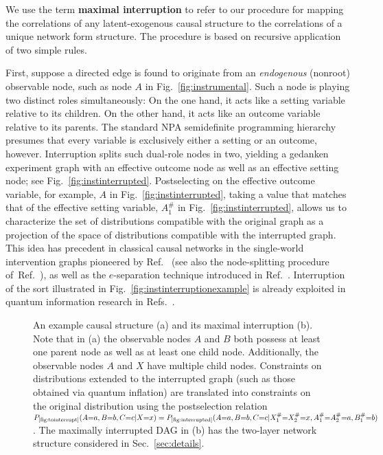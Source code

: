 \documentclass[superscriptaddress,aps,prx,nofootinbib,twocolumn,twoside,reprint,letterpaper,longbibliography]{revtex4-2}
\newcommand{\term}[1]{\textcolor{medblue}{\textbf{#1}}}
\begin{document}
We use the term \term{maximal interruption} to refer to our procedure for mapping the correlations of any latent-exogenous causal structure to the correlations of a unique network form structure. The procedure is based on recursive application of two simple rules.

First, suppose a directed edge is found to originate from an \emph{endogenous} (nonroot) observable node, such as node $A$ in Fig.~\ref{fig:instrumental}. Such a node is playing two distinct roles simultaneously: On the one hand, it acts like a setting variable relative to its children. On the other hand, it acts like an outcome variable relative to its parents. The standard NPA semidefinite programming hierarchy~\cite{npa,npa2} presumes that every variable is exclusively either a setting or an outcome, however. Interruption splits such dual-role nodes in two, yielding a gedanken experiment graph with an effective outcome node as well as an effective setting node; see Fig.~\ref{fig:instinterrupted}. Postselecting on the effective outcome variable, for example, $A$ in Fig.~\ref{fig:instinterrupted}, taking a value that matches that of the effective setting variable, $A^{\#}_1$ in Fig.~\ref{fig:instinterrupted}, allows us to characterize the set of distributions compatible with the original graph as a projection of the space of distributions compatible with the interrupted graph. This idea has precedent in classical causal networks in the single-world intervention graphs pioneered by Ref.~\cite{Richardson2013SingleWI} (see also the node-splitting procedure of~Ref.~\cite{BarrettQCM}), as well as the $e$-separation technique introduced in Ref.~\cite{evans2012graphicalmethods}. Interruption of the sort illustrated in Fig.~\ref{fig:instinterruptionexample} is already exploited in quantum information research in Refs.~\cite{Himbeeck2018instrumental,Agresti2019,Quantifying2020}.

\begin{figure}[b]
  \begin{center}
    \hfill
    \hfill
     \hfill
  \end{center}
  \caption[]{An example causal structure (a) and its maximal interruption (b). Note that in (a) the observable nodes $A$ and $B$ both possess at least one parent node as well as at least one child node. Additionally, the observable nodes $A$ and $X$ have multiple child nodes. Constraints on distributions extended to the interrupted graph (such as those obtained via quantum inflation) are translated into constraints on the original distribution using the postselection relation ${P_{\text{\ref{fig:tointerrupt}}}(A{=}a,B{=}b,C{=}c|X{=}x)} = {P_{\text{\ref{fig:interrupted}}}(A{=}a,B{=}b,C{=}c|X^\#_1{=}X^\#_2{=}x,A^{\#}_1{=}A^{\#}_2{=}a,B^{\#}_1{=}b)}$. The maximally interrupted DAG in (b) has the two-layer network structure considered in Sec.~\ref{sec:details}.
  }
  \label{fig:interruptionexample}
\end{figure}
\end{document}
